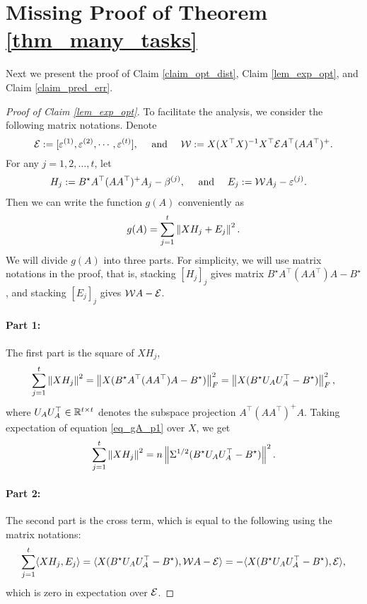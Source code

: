 \section{Missing Proof of Theorem \ref{thm_many_tasks}}\label{app_proof_error_same_cov}


	
Next we present the proof of Claim \ref{claim_opt_dist}, Claim \ref{lem_exp_opt}, and Claim \ref{claim_pred_err}. 
	\begin{proof}[Proof of Claim \ref{lem_exp_opt}]
	To facilitate the analysis, we consider the following matrix notations.
	Denote
\[\mathcal{E}  :=[\varepsilon^{(1)},\varepsilon^{(2)},\cdots, \varepsilon^{(t)}],  \quad \text{ and } \quad {\mathcal W} := X(X^{\top} X)^{-1} X^{\top} \mathcal{E} A^{\top} (AA^{\top})^{+}. \]
	For any $j = 1,2,\dots, t$, let
	\begin{align*}
		H_j &:= B^{\star} A^{\top} (AA^{\top})^{+} A_j - \beta^{(j)}, \quad \text{ and } \quad E_j := {\mathcal W} A_j - \varepsilon^{(j)}.
	\end{align*}
	Then we can write the function $g(A)$ conveniently as
	\[ g(A) = \sum_{j=1}^t \left\| X H_j + E_j \right\|^2. \]
	We will divide $g(A)$ into three parts.
	For simplicity, we will use matrix notations in the proof, %
	that is, stacking $[H_j]_j$ gives matrix $B^{\star} A^{\top} (AA^{\top}) A - B^{\star}$,
	and stacking $[E_j]_j$ gives ${\mathcal W} A - \mathcal{E}$.

	\paragraph{Part 1:} The first part is the square of $XH_j$,
	\begin{align}\label{eq_gA_p1}
		\sum_{j=1}^t \left\| X H_j \right\|^2
		= \left\| X (B^{\star} A^{\top} (AA^{\top}) A - B^{\star}) \right\|_{F}^2
		= \left\| X (B^{\star} U_A U_A^{\top} - B^{\star}) \right\|_{F}^2,
	\end{align}
	where $U_{A} U_{A}^{\top} \in\mathbb{R}^{t\times t}$ denotes the subspace projection $ {A}^{\top} ( {A}{A}^{\top})^{+}  {A}$.
	Taking expectation of equation \eqref{eq_gA_p1} over $X$, we get
		\[ \sum_{j=1}^t \left\| X H_j \right\|^2=n\left\| \Sigma^{1/2}(B^{\star} U_A U_A^{\top} - B^{\star}) \right\|^2. \]

	\paragraph{Part 2:} The second part is the cross term, which is equal to the following using the matrix notations:
	\begin{align}\label{eq_gA_p2}
		\sum_{j=1}^t\langle XH_j, E_j \rangle = \langle X(B^{\star} U_A U_A^{\top} - B^{\star}), {\mathcal W} A - \mathcal{E} \rangle
		= - \langle X (B^{\star} U_A U_A^{\top} - B^{\star}), \mathcal{E} \rangle,
	\end{align}
	which is zero in expectation over $\mathcal{E}$.


\end{proof}
